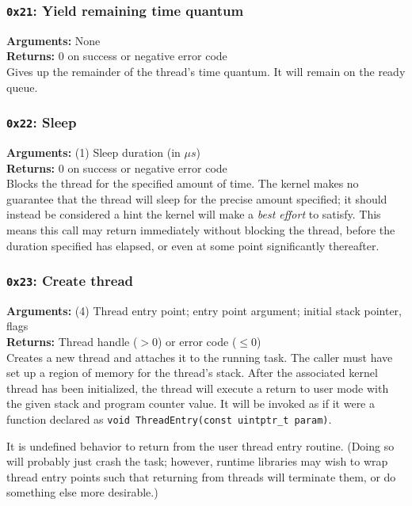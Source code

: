\documentclass[11pt]{article}
\begin{document}
\subsubsection{{\tt 0x21}: Yield remaining time quantum}
\textbf{Arguments:} None \\
\textbf{Returns:} 0 on success or negative error code \\

Gives up the remainder of the thread's time quantum. It will remain on the ready queue.

\subsubsection{{\tt 0x22}: Sleep}
\textbf{Arguments:} (1) Sleep duration (in $\mu s$) \\
\textbf{Returns:} 0 on success or negative error code \\

Blocks the thread for the specified amount of time. The kernel makes no guarantee that the thread will sleep for the precise amount specified; it should instead be considered a hint the kernel will make a \textit{best effort} to satisfy. This means this call may return immediately without blocking the thread, before the duration specified has elapsed, or even at some point significantly thereafter.

\subsubsection{{\tt 0x23}: Create thread}
\textbf{Arguments:} (4) Thread entry point; entry point argument; initial stack pointer, flags \\
\textbf{Returns:} Thread handle ($>0$) or error code ($\leq0$) \\

Creates a new thread and attaches it to the running task. The caller must have set up a region of memory for the thread's stack. After the associated kernel thread has been initialized, the thread will execute a return to user mode with the given stack and program counter value. It will be invoked as if it were a function declared as \texttt{void ThreadEntry(const uintptr\_t param)}.

It is undefined behavior to return from the user thread entry routine. (Doing so will probably just crash the task; however, runtime libraries may wish to wrap thread entry points such that returning from threads will terminate them, or do something else more desirable.)
\end{document}

